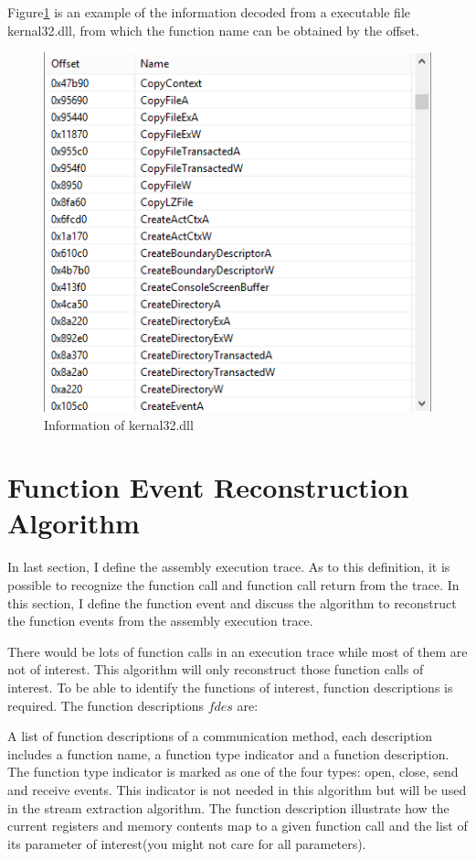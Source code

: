 Figure\ref{executable} is an example of the information decoded from a executable file kernal32.dll, from which the function name can be obtained by the offset.

\begin{figure}[H]
\centerline{\includegraphics[scale=0.6]{Figures/executable}}
\caption{Information of kernal32.dll}
\label{executable}
\end{figure}

\section{Function Event Reconstruction Algorithm}
In last section, I define the assembly execution trace. As to this definition, it is possible to recognize the function call and function call return from the trace.  In this section, I define the function event and discuss the algorithm to reconstruct the function events from the assembly execution trace. 


There would be lots of function calls in an execution trace while most of them are not of interest. This algorithm will only reconstruct those function calls of interest. To be able to identify the functions of interest, function descriptions is required. The function descriptions $fdes$ are:

A list of function descriptions of a communication method, each description includes a function name, a function type indicator and a function description. The function type indicator is marked as one of the four types: open, close, send and receive events. This indicator is not needed in this algorithm but will be used in the stream extraction algorithm. The function description illustrate how the current registers and memory contents map to a given function call and the list of its parameter of interest(you might not care for all parameters). 

